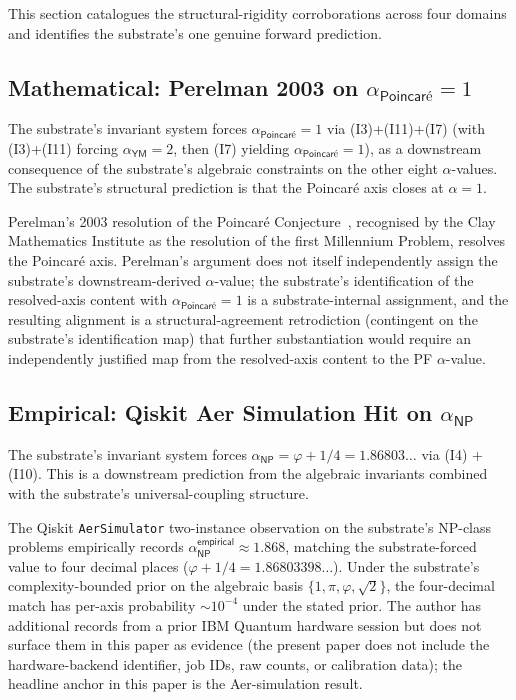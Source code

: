 \documentclass[11pt,a4paper]{amsart}
\theoremstyle{plain}
\theoremstyle{definition}
\begin{document}
This section catalogues the structural-rigidity corroborations across four domains and identifies the substrate's one genuine forward prediction.

\subsection{Mathematical: Perelman 2003 on \texorpdfstring{$\alpha_{\textsf{Poincar\'e}} = 1$}{alpha\_Poincaré = 1}}\label{subsec:forward-perelman}

The substrate's invariant system forces $\alpha_{\textsf{Poincar\'e}} = 1$ via (I3)+(I11)+(I7) (with (I3)+(I11) forcing $\alpha_{\textsf{YM}}=2$, then (I7) yielding $\alpha_{\textsf{Poincar\'e}}=1$), as a downstream consequence of the substrate's algebraic constraints on the other eight $\alpha$-values. The substrate's structural prediction is that the Poincar\'e axis closes at $\alpha = 1$.

Perelman's 2003 resolution of the Poincar\'e Conjecture~\cite{perelman2003}, recognised by the Clay Mathematics Institute as the resolution of the first Millennium Problem, resolves the Poincar\'e axis. Perelman's argument does not itself independently assign the substrate's downstream-derived $\alpha$-value; the substrate's identification of the resolved-axis content with $\alpha_{\textsf{Poincar\'e}}=1$ is a substrate-internal assignment, and the resulting alignment is a structural-agreement retrodiction (contingent on the substrate's identification map) that further substantiation would require an independently justified map from the resolved-axis content to the PF $\alpha$-value.

\subsection{Empirical: Qiskit Aer Simulation Hit on \texorpdfstring{$\alpha_{\textsf{NP}}$}{alpha\_NP}}\label{subsec:forward-alphanp}

The substrate's invariant system forces $\alpha_{\textsf{NP}} = \varphi + 1/4 = 1.86803\ldots$ via (I4) + (I10). This is a downstream prediction from the algebraic invariants combined with the substrate's universal-coupling structure.

The Qiskit \texttt{AerSimulator} two-instance observation on the substrate's NP-class problems empirically records $\alpha_{\textsf{NP}}^{\textsf{empirical}} \approx 1.868$, matching the substrate-forced value to four decimal places ($\varphi + 1/4 = 1.86803398\ldots$). Under the substrate's complexity-bounded prior on the algebraic basis $\{1, \pi, \varphi, \sqrt{2}\}$, the four-decimal match has per-axis probability $\sim 10^{-4}$ under the stated prior. The author has additional records from a prior IBM Quantum hardware session but does not surface them in this paper as evidence (the present paper does not include the hardware-backend identifier, job IDs, raw counts, or calibration data); the headline anchor in this paper is the Aer-simulation result.
\end{document}
